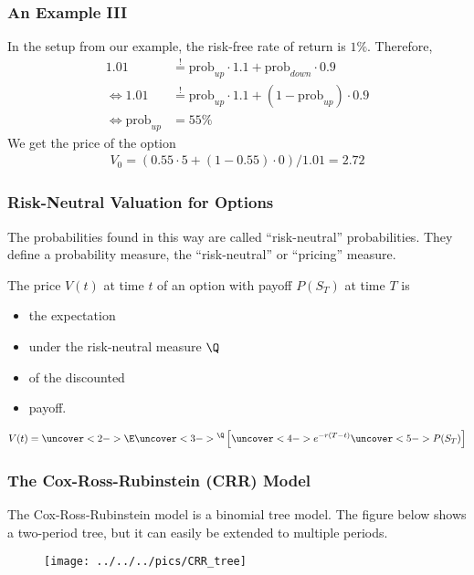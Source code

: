 \begin{frame}[fragile]
\frametitle{An Example III}
In the setup from our example, the risk-free rate of return is $1\%$. Therefore,
\begin{align*}
  1.01 &\stackrel{!}{=} \text{prob}_{up} \cdot 1.1 + \text{prob}_{down} \cdot 0.9 \\
  \Leftrightarrow 1.01 &\stackrel{!}{=} \text{prob}_{up} \cdot 1.1 + (1-\text{prob}_{up})
  \cdot 0.9 \\
  \Leftrightarrow \text{prob}_{up} &= 55\%
\end{align*}
We get the price of the option
\begin{align*}
  V_0 = (0.55 \cdot 5 + (1-0.55)\cdot 0)/1.01 = 2.72
\end{align*}
\end{frame}

\begin{frame}[fragile]
\frametitle{Risk-Neutral Valuation for Options}
The probabilities found in this way are called ``risk-neutral'' probabilities.
They define a probability measure, the ``risk-neutral'' or ``pricing''
measure.\\
\vspace{0.5cm}

The price $V(t)$ at time $t$ of an option with payoff $P(S_T)$ at time $T$ is
\begin{itemize}
  \item<2-> the expectation
  \item<3-> under the risk-neutral measure $\Q$
  \item<4-> of the discounted
  \item<5-> payoff.
\end{itemize}
\begin{block}{}
\begin{align*}
  V(t) = \uncover<2->{\E\uncover<3->{^\Q}\left[ \uncover<4->{e^{-r(T-t)}}
  \uncover<5->{P(S_T)}\right]}
\end{align*}
\end{block}
\end{frame}

\begin{frame}[fragile]
\frametitle{The Cox-Ross-Rubinstein (CRR) Model}
The Cox-Ross-Rubinstein model is a binomial tree model. The figure below shows a
two-period tree, but it can easily be extended to multiple periods.
\begin{figure}[htp]
\begin{center}
\texttt{[image: ../../../pics/CRR\_tree]}
\end{center}
\end{figure}
\end{frame}


